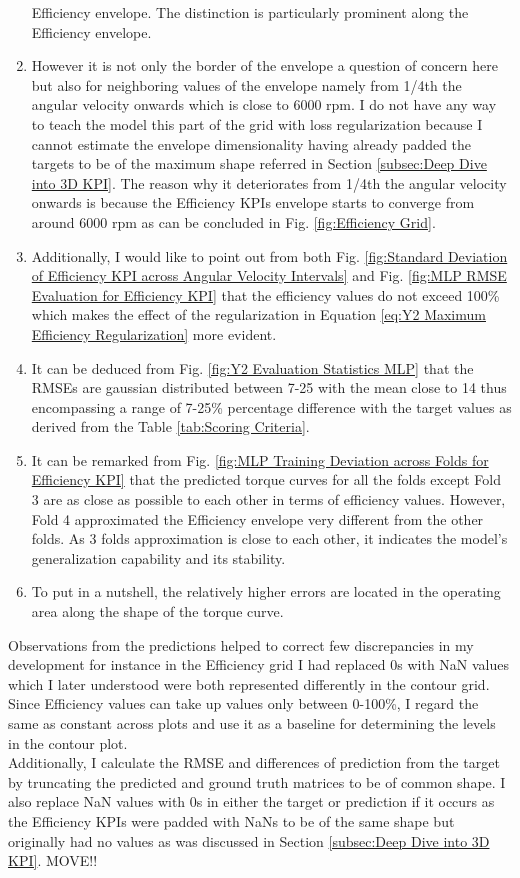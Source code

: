 \documentclass{report} %
\begin{document}
\begin{enumerate}[nosep]
    Efficiency envelope. The distinction is particularly prominent along the Efficiency envelope.
    \item However it is not only the border of the envelope a question of concern here but also for neighboring values of the envelope namely from 1/4th the 
    angular velocity onwards which is close to 6000 rpm. 
    I do not have any way to teach the model this part of the grid with loss regularization because I cannot estimate the envelope dimensionality having already padded 
    the targets to be of the maximum shape referred in Section \ref{subsec:Deep Dive into 3D KPI}. The reason why it deteriorates from 1/4th the angular velocity onwards is 
    because the Efficiency \ac{KPI}s envelope starts to converge from around 6000 rpm as can be concluded in Fig. \ref{fig:Efficiency Grid}. 
    \item Additionally, I would like to point out from both Fig. \ref{fig:Standard Deviation of Efficiency KPI across Angular Velocity Intervals} and Fig. 
    \ref{fig:MLP RMSE Evaluation for Efficiency KPI} that the efficiency values do not exceed 100\% which makes the effect of the regularization in Equation 
    \ref{eq:Y2 Maximum Efficiency Regularization} more evident.
    \item It can be deduced from Fig. \ref{fig:Y2 Evaluation Statistics MLP} that the \ac{RMSE}s are gaussian distributed between 7-25 with the mean close to 14 thus 
    encompassing a range of 7-25\% percentage difference with the target values as derived from the Table \ref{tab:Scoring Criteria}.
    \item It can be remarked from Fig. \ref{fig:MLP Training Deviation across Folds for Efficiency KPI} that the predicted torque curves for all the folds except Fold 3 
    are as close as possible to each other in terms of efficiency values. However, Fold 4 approximated the Efficiency envelope very different from the other folds. 
    As 3 folds approximation is close to each other, it indicates the model's generalization capability and its stability.
    \item To put in a nutshell, the relatively higher errors are located in the operating area along the shape of the torque curve.\\
\end{enumerate}

Observations from the predictions helped to correct few discrepancies in my development for instance in the Efficiency grid I had replaced 0s with \ac{NaN} values which 
I later understood were both represented differently in the contour grid. Since Efficiency values can take up values only between 0-100\%, I regard the same as constant 
across plots and use it as a baseline for determining the levels in the contour plot.\\
Additionally, I calculate the \ac{RMSE} and differences of prediction from the target by truncating the predicted and ground truth matrices to be of common shape.
I also replace \ac{NaN} values with 0s in either the target or prediction if it occurs as the Efficiency \ac{KPI}s were padded with \ac{NaN}s to be of the same shape 
but originally had no values as was discussed in Section \ref{subsec:Deep Dive into 3D KPI}. MOVE!!
\end{document}
